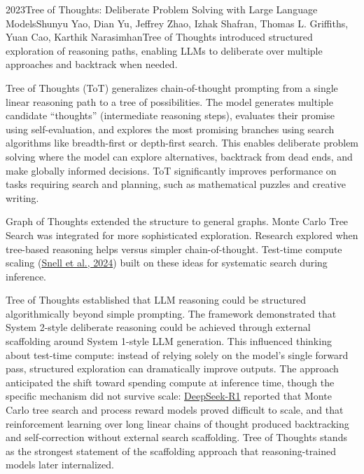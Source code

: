 
\begin{papersummary}{2023}{Tree of Thoughts: Deliberate Problem Solving with Large Language Models}{Shunyu Yao, Dian Yu, Jeffrey Zhao, Izhak Shafran, Thomas L. Griffiths, Yuan Cao, Karthik Narasimhan}{Tree of Thoughts introduced structured exploration of reasoning paths, enabling LLMs to deliberate over multiple approaches and backtrack when needed.}

Tree of Thoughts (ToT) generalizes chain-of-thought prompting from a single linear reasoning path to a tree of possibilities. The model generates multiple candidate ``thoughts'' (intermediate reasoning steps), evaluates their promise using self-evaluation, and explores the most promising branches using search algorithms like breadth-first or depth-first search. This enables deliberate problem solving where the model can explore alternatives, backtrack from dead ends, and make globally informed decisions. ToT significantly improves performance on tasks requiring search and planning, such as mathematical puzzles and creative writing.

Graph of Thoughts extended the structure to general graphs. Monte Carlo Tree Search was integrated for more sophisticated exploration. Research explored when tree-based reasoning helps versus simpler chain-of-thought. Test-time compute scaling (\hyperref[paper:snell-2024-test-time]{Snell et al., 2024}) built on these ideas for systematic search during inference.

Tree of Thoughts established that LLM reasoning could be structured algorithmically beyond simple prompting. The framework demonstrated that System 2-style deliberate reasoning could be achieved through external scaffolding around System 1-style LLM generation. This influenced thinking about test-time compute: instead of relying solely on the model's single forward pass, structured exploration can dramatically improve outputs. The approach anticipated the shift toward spending compute at inference time, though the specific mechanism did not survive scale: \hyperref[paper:deepseek-2025-r1]{DeepSeek-R1} reported that Monte Carlo tree search and process reward models proved difficult to scale, and that reinforcement learning over long linear chains of thought produced backtracking and self-correction without external search scaffolding. Tree of Thoughts stands as the strongest statement of the scaffolding approach that reasoning-trained models later internalized.

\end{papersummary}
